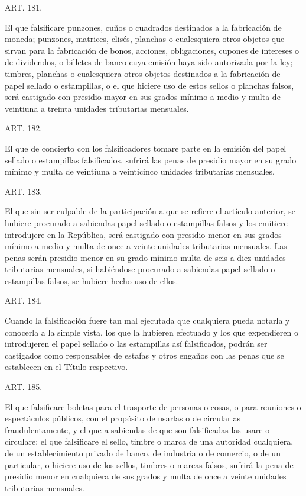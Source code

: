     ART. 181.

    El que falsificare punzones, cuños o cuadrados destinados a la fabricación de moneda; punzones, matrices, clisés, planchas o cualesquiera otros objetos que sirvan para la fabricación de bonos, acciones, obligaciones, cupones de intereses o de dividendos, o billetes de banco cuya emisión haya sido autorizada por la ley; timbres, planchas o cualesquiera otros objetos destinados a la fabricación de papel sellado o estampillas, o el que hiciere uso de estos sellos o planchas falsos, será castigado con presidio mayor en sus grados mínimo a medio y multa de veintiuna a treinta unidades tributarias mensuales.







    ART. 182.

    El que de concierto con los falsificadores tomare parte en la emisión del papel sellado o estampillas falsificados, sufrirá las penas de presidio mayor en su grado mínimo y multa de veintiuna a veinticinco unidades tributarias mensuales.








    ART. 183.

    El que sin ser culpable de la participación a que se refiere el artículo anterior, se hubiere procurado a sabiendas papel sellado o estampillas falsos y los emitiere introdujere en la República, será castigado con presidio menor en sus grados mínimo a medio y multa de once a veinte unidades tributarias mensuales.
    Las penas serán presidio menor en su grado mínimo multa de seis a diez unidades tributarias mensuales, si habiéndose procurado a sabiendas papel sellado o estampillas falsos, se hubiere hecho uso de ellos.



    ART. 184.

    Cuando la falsificación fuere tan mal ejecutada que cualquiera pueda notarla y conocerla a la simple vista, los que la hubieren efectuado y los que expendieren o introdujeren el papel sellado o las estampillas así falsificados, podrán ser castigados como responsables de estafas y otros engaños con las penas que se establecen en el Título respectivo.


    ART. 185.

    El que falsificare boletas para el trasporte de personas o cosas, o para reuniones o espectáculos públicos, con el propósito de usarlas o de circularlas fraudulentamente, y el que a sabiendas de que son falsificadas las usare o circulare; el que falsificare el sello, timbre o marca de una autoridad cualquiera, de un establecimiento privado de banco, de industria o de comercio, o de un particular, o hiciere uso de los sellos, timbres o marcas falsos, sufrirá la pena de presidio menor en cualquiera de sus grados y multa de once a veinte unidades tributarias mensuales.






